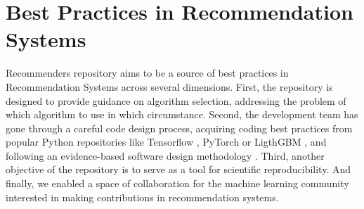 \section{Best Practices in Recommendation Systems}

Recommenders repository aims to be a source of best practices in Recommendation Systems
across several dimensions. First, the repository is designed to provide guidance on algorithm
selection, addressing the problem of which algorithm to use in which circumstance. 
Second, the development team has gone through a careful code design process, acquiring 
coding best practices from popular Python repositories like Tensorflow 
\cite{abadi2016tensorflow}, PyTorch \cite{paszke2017automatic} or LigthGBM 
\cite{ke2017lightgbm}, and following an evidence-based software design methodology 
\cite{joeglekar2018evidence}. Third, another objective of the repository
is to serve as a tool for scientific reproducibility. And finally, we enabled a 
space of collaboration for the machine learning community interested in making 
contributions in recommendation systems.






